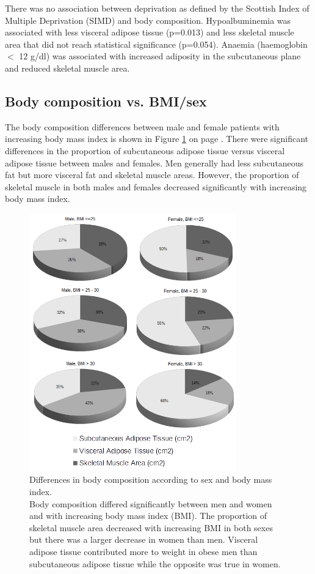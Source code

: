 There was no association between deprivation as defined by the Scottish Index of Multiple Deprivation (SIMD) and body composition.
Hypoalbuminemia was associated with less visceral adipose tissue (p=0.013) and less skeletal muscle area that did not reach statistical significance (p=0.054). 
Anaemia (haemoglobin $<$ 12 g/dl) was associated with increased adiposity in the subcutaneous plane and reduced skeletal muscle area. 
	
\clearpage

\subsection{Body composition vs. BMI/sex}
The body composition differences between male and female patients with increasing body mass index is shown in Figure \ref{fig:bc_gender_bmi} on page \pageref{fig:bc_gender_bmi}. 
There were significant differences in the proportion of subcutaneous adipose tissue versus visceral adipose tissue between males and females. 
Men generally had less subcutaneous fat but more visceral fat and skeletal muscle areas. 
However, the proportion of skeletal muscle in both males and females decreased significantly with increasing body mass index.

\begin{figure}[h]
	\centering
	\includegraphics[width=0.8\textwidth]{Figures/bc_gender_bmi_pie}
	\caption[Differences in body composition according to sex and body mass index.]
	{Differences in body composition according to sex and body mass index.
	\\Body composition differed significantly between men and women and with increasing body mass index (BMI). The proportion of skeletal muscle area decreased with increasing BMI in both sexes but there was a larger decrease in women than men. Visceral adipose tissue contributed more to weight in obese men than subcutaneous adipose tissue while the opposite was true in women.}
	\label{fig:bc_gender_bmi}
\end{figure}

